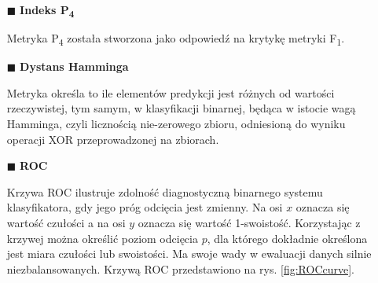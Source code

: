 \begin{itemize}
    \item[$\blacksquare$] \textbf{Indeks P\textsubscript{4}}
    \par
    Metryka P\textsubscript{4} została stworzona jako odpowiedź na krytykę metryki F\textsubscript{1}\cite{sitarz2022extending}.
    \par

    \item[$\blacksquare$] \textbf{Dystans Hamminga}
    \par Metryka określa to ile elementów predykcji jest różnych od wartości rzeczywistej, tym samym, w klasyfikacji binarnej, będąca w istocie wagą Hamminga, czyli licznością nie-zerowego zbioru, odniesioną do wyniku operacji XOR przeprowadzonej na zbiorach. \cite{Warren2012-lw}
    \par

    \item[$\blacksquare$] \textbf{ROC} 
    \par
    \begin{minipage}{0.4\linewidth}
        Krzywa ROC ilustruje zdolność diagnostyczną binarnego systemu klasyfikatora, gdy jego próg odcięcia jest zmienny. Na osi $x$ oznacza się wartość czułości a na osi $y$ oznacza się wartość 1-swoistość. Korzystając z krzywej można określić poziom odcięcia $p$, dla którego dokładnie określona jest miara czułości lub swoistości. Ma swoje wady w ewaluacji danych silnie niezbalansowanych\cite{Saito2015-vf}. Krzywą ROC przedstawiono na rys. \ref{fig:ROCcurve}. 
        \vspace{0.4\linewidth}
    \end{minipage}
    \begin{minipage}{0.6\linewidth}
    

\end{minipage}
\end{itemize}
